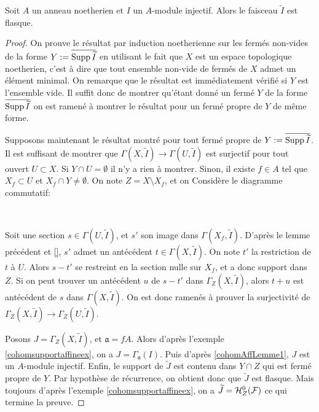 \begin{prop}\label{cohomAffProp1}
Soit $A$ un anneau noetherien et $I$ un $A$-module injectif. Alors le faisceau $\widetilde{I}$ est flasque.
\end{prop}
\begin{proof}
On prouve le résultat par induction noetherienne sur les fermés  non-vides de la forme $Y:=\overline{\operatorname{Supp} \widetilde{I}}$ en utilisant le fait que $X$ est un espace topologique noetherien, c'est à dire que tout ensemble non-vide de fermés de $X$ admet un élément minimal. On remarque que le résultat est immédiatement vérifié si $Y$ est l'ensemble vide. Il suffit donc de montrer qu'étant donné un fermé $Y$ de la forme $\overline{\operatorname{Supp} \widetilde{I}}$ on est ramené à montrer le résultat pour un fermé propre de $Y$ de même forme.

Supposons maintenant le résultat montré pour tout fermé propre de $Y:=\overline{\operatorname{Supp} \widetilde{I}}$. Il est suffisant de montrer que $\Gamma(X,\widetilde{I})\rightarrow\Gamma(U,\widetilde{I})$ est surjectif pour tout ouvert $U\subset X$. Si $Y\cap U=\emptyset$ il n'y a rien à montrer. Sinon, il existe $f\in A$ tel que $X_f\subset U$ et $X_f\cap Y\neq \emptyset$. On note $Z= X\setminus X_f$, et on Considère le diagramme commutatif:

	\begin{center}
	\\
	\end{center}
Soit une section $s\in\Gamma(U,\widetilde{I})$, et $s'$ son image dans $\Gamma(X_f,\widetilde{I})$. D'après le lemme précédent et \ref{}, $s'$ admet un antécédent $t\in \Gamma(X,\widetilde{I})$. On note $t'$ la restriction de $t$ à $U$. Alors $s-t'$ se restreint en la section nulle sur $X_f$, et a donc support dans $Z$. Si on peut trouver un antécédent $u$ de $s-t'$ dans $\Gamma_Z(X,\widetilde{I})$, alors $t+u$ est antécédent de $s$ dans $\Gamma(X,\widetilde{I})$. On est donc ramenés à prouver la surjectivité de $\Gamma_Z(X,\widetilde{I})\rightarrow\Gamma_Z(U,\widetilde{I})$.

Posons $J=\Gamma_Z(X,\widetilde{I})$, et $\mathfrak{a}=fA$. Alors d'après l'exemple \ref{cohomsupportaffineex}, on a $J=\Gamma_\mathfrak{a}(I)$. Puis d'après \ref{cohomAffLemme1}, $J$ est un $A$-module injectif. Enfin, le support de $\widetilde{J}$ est contenu dans $Y\cap Z$ qui est fermé propre de $Y$. Par hypothèse de récurrence, on obtient donc que $\widetilde{J}$ est flasque. Mais toujours d'après l'exemple \ref{cohomsupportaffineex}, on a $\widetilde{J} = \mathcal{H} ^0 _Z(\mathcal{F})$ ce qui termine la preuve.
\end{proof}


